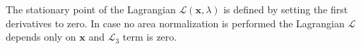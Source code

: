 The stationary point of the Lagrangian $\mathcal{L}(\mathbf{x}, \lambda)$ is defined by setting the first derivatives to zero. In case no 
area normalization is performed the Lagrangian $\mathcal{L}$ depends only on $\mathbf{x}$ and $\mathcal{L}_{3}$ term is zero.
% 
